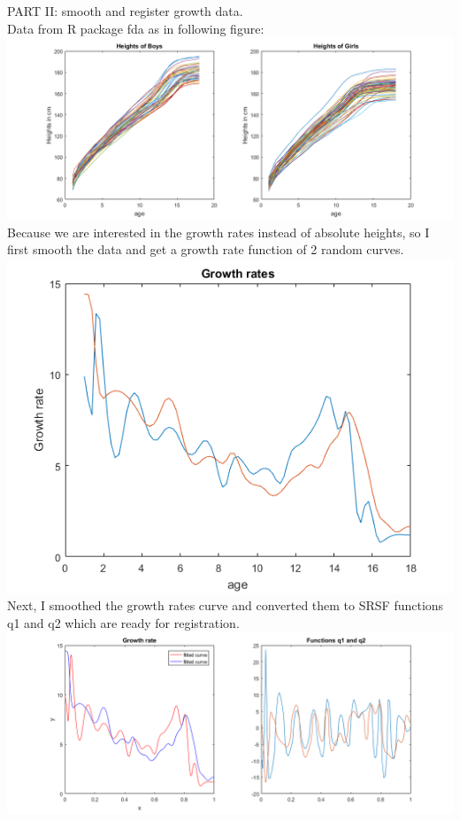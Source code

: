 \documentclass[11pt]{scrartcl}
\begin{document}
PART II: smooth and register growth data.\\
Data from R package fda as in following figure:\\
\includegraphics[scale=0.6]{hw57.png}\\
Because we are interested in the growth rates instead of absolute heights, so I first smooth the data and get a growth rate function of 2 random curves.\\
\includegraphics[scale=0.6]{hw58.png}\\
Next, I smoothed the growth rates curve and converted them to SRSF functions q1 and q2 which are ready for registration.\\
\includegraphics[scale=0.6]{hw59.png}\\
\end{document}
